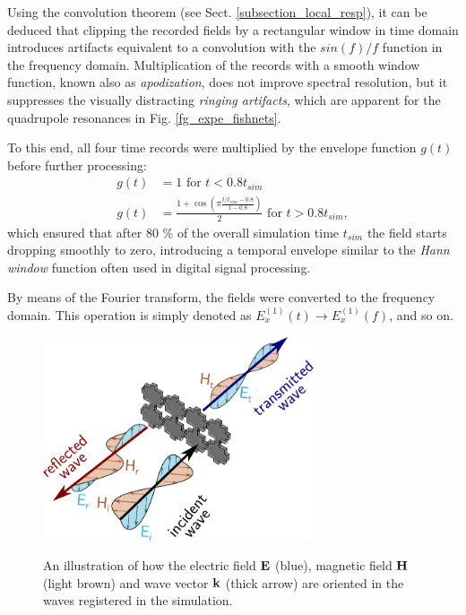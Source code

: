\label{convolringing}
Using the convolution theorem (see Sect. \ref{subsection_local_resp}), it can be deduced that clipping the recorded fields by a rectangular window in time domain introduces artifacts equivalent to a convolution with the $sin(f)/f$ function in the frequency domain. Multiplication of the records with a smooth window function, known also as \textit{apodization}, does not improve spectral resolution, but it suppresses the visually distracting \textit{ringing artifacts}, which are apparent for the quadrupole resonances in Fig. \ref{fg_expe_fishnets}. 

To this end, all four time records were multiplied by the envelope function $g(t)$ before further processing:
\begin{equation} 
\begin{split}
	g(t) 	& = 1 \text{ for } t < 0.8 t_{sim} \\
	g(t)    & = \frac{1 + \cos\left(\pi \frac{t/t_{sim}-0.8}{1-0.8}\right)}{2}  \text{ for } t > 0.8 t_{sim},
\end{split}
\label{eq_envelope}\end{equation}
which ensured that after 80 \% of the overall simulation time $t_{sim}$ the field starts dropping smoothly to zero, introducing a temporal envelope similar to the \textit{Hann window} function often used in digital signal processing. 

By means of the Fourier transform, the fields were converted to the frequency domain. This operation is simply denoted as $E_{x}^{(1)}(t) \rightarrow E_{x}^{(1)}(f)$, and so on. 
\begin{figure}[ht] \caption{An illustration of how the electric field $\mathbf{E}$ (blue), magnetic field $\mathbf{H}$ (light brown) and wave vector ${\mathbf{k}}$ (thick arrow) are oriented in the waves registered in the simulation.}  \centering \includegraphics[width=8cm]{img/sim_separating_wave.pdf} \label{fg_separating_wave}\end{figure}

